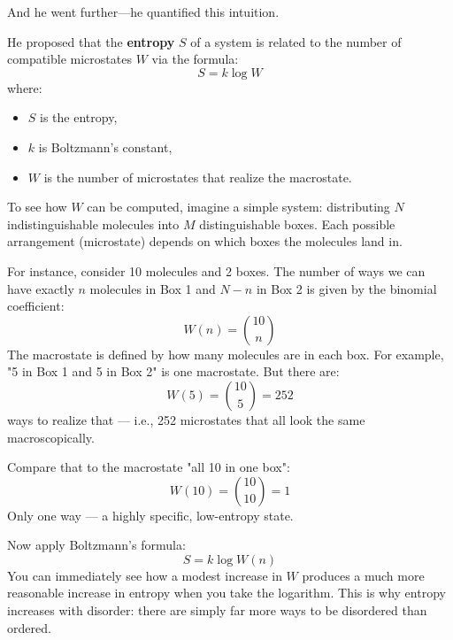 And he went further—he quantified this intuition.

He proposed that the \textbf{entropy} \( S \) of a system is related to the number of compatible microstates \( W \) via the formula:
\[
S = k \log W
\]
where:
\begin{itemize}
  \item \( S \) is the entropy,
  \item \( k \) is Boltzmann’s constant,
  \item \( W \) is the number of microstates that realize the macrostate.
\end{itemize}

To see how \( W \) can be computed, imagine a simple system: distributing \( N \) indistinguishable molecules into \( M \) distinguishable boxes. Each possible arrangement (microstate) depends on which boxes the molecules land in.

For instance, consider 10 molecules and 2 boxes. The number of ways we can have exactly \( n \) molecules in Box 1 and \( N - n \) in Box 2 is given by the binomial coefficient:
\[
W(n) = \binom{10}{n}
\]
The macrostate is defined by how many molecules are in each box. For example, "5 in Box 1 and 5 in Box 2" is one macrostate. But there are:
\[
W(5) = \binom{10}{5} = 252
\]
ways to realize that — i.e., 252 microstates that all look the same macroscopically.

Compare that to the macrostate "all 10 in one box":
\[
W(10) = \binom{10}{10} = 1
\]
Only one way — a highly specific, low-entropy state.

Now apply Boltzmann’s formula:
\[
S = k \log W(n)
\]
You can immediately see how a modest increase in \( W \) produces a much more reasonable increase in entropy when you take the logarithm. This is why entropy increases with disorder: there are simply far more ways to be disordered than ordered.



